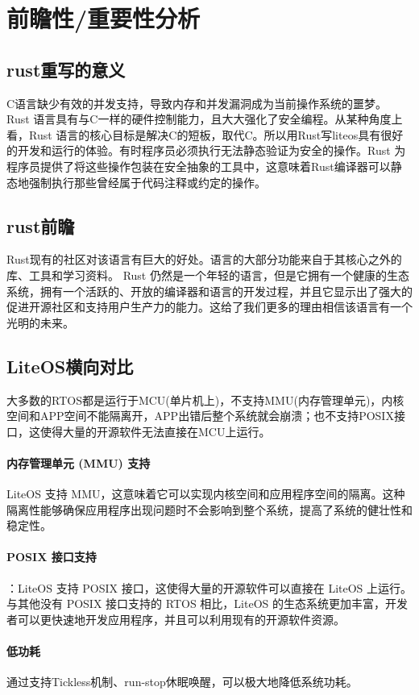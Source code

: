 \documentclass{article}
\begin{document}
\section{前瞻性/重要性分析}
\subsection{rust重写的意义}
C语言缺少有效的并发支持，导致内存和并发漏洞成为当前操作系统的噩梦。
Rust 语言具有与C一样的硬件控制能力，且大大强化了安全编程。从某种角度上看，Rust 语言的核心目标是解决C的短板，取代C。所以用Rust写liteos具有很好的开发和运行的体验。\supercite{ref12}有时程序员必须执行无法静态验证为安全的操作。Rust 为程序员提供了将这些操作包装在安全抽象的工具中，这意味着Rust编译器可以静态地强制执行那些曾经属于代码注释或约定的操作。
\subsection{rust前瞻}
Rust现有的社区对该语言有巨大的好处。语言的大部分功能来自于其核心之外的库、工具和学习资料。 Rust 仍然是一个年轻的语言，但是它拥有一个健康的生态系统，拥有一个活跃的、开放的编译器和语言的开发过程，并且它显示出了强大的促进开源社区和支持用户生产力的能力。这给了我们更多的理由相信该语言有一个光明的未来。\supercite{ref13}
\subsection{LiteOS横向对比}
大多数的RTOS都是运行于MCU(单片机上)，不支持MMU(内存管理单元)，内核空间和APP空间不能隔离开，APP出错后整个系统就会崩溃；也不支持POSIX接口，这使得大量的开源软件无法直接在MCU上运行。
\paragraph{内存管理单元 (MMU) 支持}LiteOS 支持 MMU，这意味着它可以实现内核空间和应用程序空间的隔离。这种隔离性能够确保应用程序出现问题时不会影响到整个系统，提高了系统的健壮性和稳定性。
\paragraph{POSIX 接口支持}：LiteOS 支持 POSIX 接口，这使得大量的开源软件可以直接在 LiteOS 上运行。与其他没有 POSIX 接口支持的 RTOS 相比，LiteOS 的生态系统更加丰富，开发者可以更快速地开发应用程序，并且可以利用现有的开源软件资源。
\paragraph{低功耗}通过支持Tickless机制、run-stop休眠唤醒，可以极大地降低系统功耗。
\end{document}
